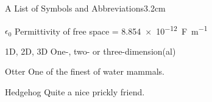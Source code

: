 \begin{mclistof}{A List of Symbols and Abbreviations}{3.2cm}

\item[$\epsilon_0$] Permittivity of free space = \qty{8.854e-12}{F.m^{-1}}


\item[1D, 2D, 3D] One-, two- or three-dimension(al)

\item[Otter] One of the finest of water mammals.

\item[Hedgehog] Quite a nice prickly friend.

\begin{acronym}
\end{acronym}

\end{mclistof} 
